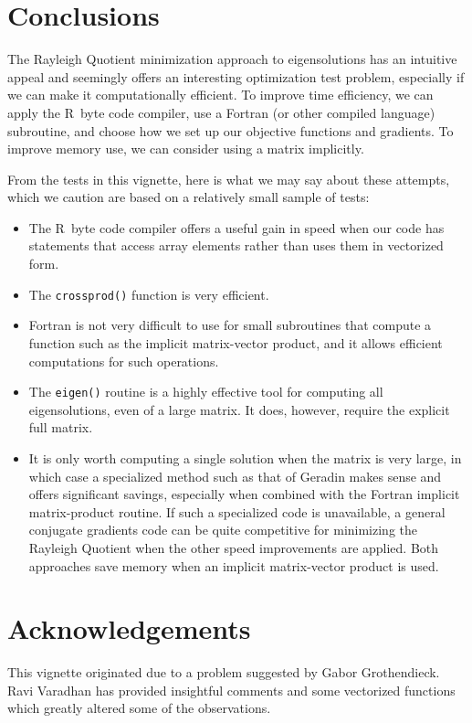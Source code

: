 \documentclass[10pt]{article}\usepackage[]{graphicx}\usepackage[]{color}
\newcommand{\R}{{\sf R\ }}
\newcommand{\code}[1]{{\tt #1}}
\begin{document}
\section{Conclusions}

The Rayleigh Quotient minimization approach to eigensolutions has an 
intuitive appeal and seemingly offers an interesting optimization 
test problem, especially if we can make it computationally efficient.
To improve time efficiency, we can apply the \R byte code compiler, 
use a Fortran (or other compiled language) subroutine, and choose
how we set up our objective functions and gradients. To improve
memory use, we can consider using a matrix implicitly.

From the tests in this vignette, here is what we may say about these
attempts, which we caution are based on a relatively small sample of
tests:

\begin{itemize}
\item{The \R byte code compiler offers a useful gain in speed when 
our code has statements that access array elements rather than uses
them in vectorized form.}
\item{The \code{crossprod()} function is very efficient.}
\item{Fortran is not very difficult to use for small subroutines
that compute a function such as the implicit matrix-vector product, 
and it allows efficient computations for such operations.}
\item{The \code{eigen()} routine is a highly effective tool for
computing all eigensolutions, even of a large matrix. It does,
however, require the explicit full matrix.}
\item{It is only
worth computing a single solution when the matrix is very large,
in which case a specialized method such as that of Geradin makes
sense and offers significant savings, especially when combined with
the Fortran implicit matrix-product routine. If such a specialized
code is unavailable, a general conjugate gradients code can be quite
competitive for minimizing the Rayleigh Quotient when the other
speed improvements are applied. Both approaches save memory when
an implicit matrix-vector product is used.}
\end{itemize}

\section*{Acknowledgements}

This vignette originated due to a problem suggested by Gabor Grothendieck. Ravi Varadhan
has provided insightful comments and some vectorized functions which
greatly altered some of the observations.
\end{document}
